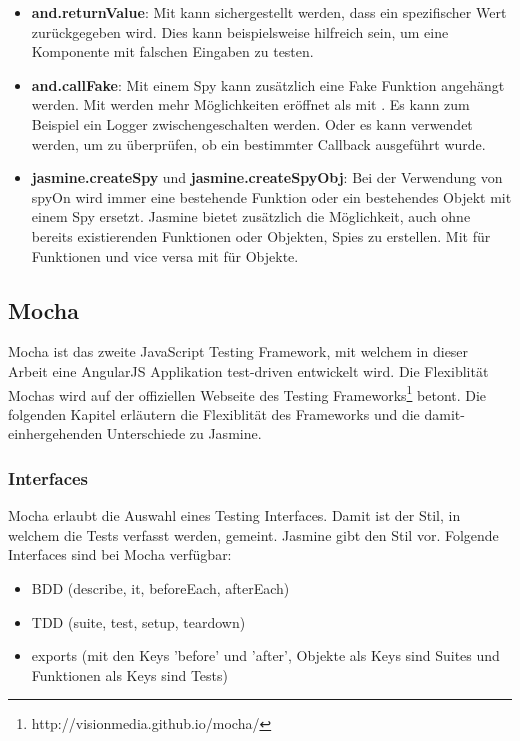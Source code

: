 \begin{itemize}
  \item \textbf{and.returnValue}: \newline
  Mit  kann sichergestellt werden, dass ein spezifischer Wert zurückgegeben wird. Dies kann beispielsweise hilfreich sein, um eine Komponente mit falschen Eingaben zu testen.

  \item \textbf{and.callFake}: \newline
  Mit einem Spy kann zusätzlich eine Fake Funktion angehängt werden. Mit  werden mehr Möglichkeiten eröffnet als mit . Es kann zum Beispiel ein Logger zwischengeschalten werden. Oder es kann verwendet werden, um zu überprüfen, ob ein bestimmter Callback ausgeführt wurde.

  \item \textbf{jasmine.createSpy} und \textbf{jasmine.createSpyObj}: \newline
  Bei der Verwendung von spyOn wird immer eine bestehende Funktion oder ein bestehendes Objekt mit einem Spy ersetzt. Jasmine bietet zusätzlich die Möglichkeit, auch ohne bereits existierenden Funktionen oder Objekten, Spies zu erstellen. Mit  für Funktionen und vice versa mit  für Objekte.

\end{itemize}

\newpage
\subsection{Mocha}
Mocha ist das zweite JavaScript Testing Framework, mit welchem in dieser Arbeit eine AngularJS Applikation test-driven entwickelt wird. Die Flexiblität Mochas wird auf der offiziellen Webseite des Testing Frameworks\footnote{http://visionmedia.github.io/mocha/} betont. Die folgenden Kapitel erläutern die Flexiblität des Frameworks und die damit-einhergehenden Unterschiede zu Jasmine.

\subsubsection{Interfaces}
Mocha erlaubt die Auswahl eines Testing Interfaces. Damit ist der Stil, in welchem die Tests verfasst werden, gemeint. Jasmine gibt den Stil  vor. Folgende Interfaces sind bei Mocha verfügbar:
\begin{itemize}
  \item BDD (describe, it, beforeEach, afterEach)
  \item TDD (suite, test, setup, teardown)
  \item exports (mit den Keys 'before' und 'after', Objekte als Keys sind Suites und Funktionen als Keys sind Tests)
\end{itemize}

